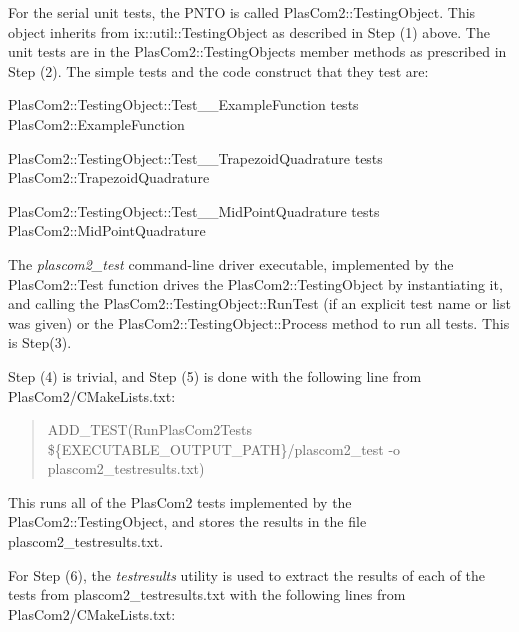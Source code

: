 For the serial unit tests, the P\+N\+TO is called Plas\+Com2\+::\+Testing\+Object. This object inherits from ix\+::util\+::\+Testing\+Object as described in Step (1) above. The unit tests are in the Plas\+Com2\+::\+Testing\+Object\textquotesingle{}s member methods as prescribed in Step (2). The simple tests and the code construct that they test are\+:
\begin{DoxyItemize}
\item Plas\+Com2\+::\+Testing\+Object\+::\+Test\+\_\+\+\_\+\+Example\+Function tests Plas\+Com2\+::\+Example\+Function
\item Plas\+Com2\+::\+Testing\+Object\+::\+Test\+\_\+\+\_\+\+Trapezoid\+Quadrature tests Plas\+Com2\+::\+Trapezoid\+Quadrature
\item Plas\+Com2\+::\+Testing\+Object\+::\+Test\+\_\+\+\_\+\+Mid\+Point\+Quadrature tests Plas\+Com2\+::\+Mid\+Point\+Quadrature
\end{DoxyItemize}

The {\itshape plascom2\+\_\+test} command-\/line driver executable, implemented by the Plas\+Com2\+::\+Test function drives the Plas\+Com2\+::\+Testing\+Object by instantiating it, and calling the Plas\+Com2\+::\+Testing\+Object\+::\+Run\+Test (if an explicit test name or list was given) or the Plas\+Com2\+::\+Testing\+Object\+::\+Process method to run all tests. This is Step(3).

Step (4) is trivial, and Step (5) is done with the following line from {\ttfamily Plas\+Com2/\+C\+Make\+Lists.\+txt}\+:

\begin{quote}
A\+D\+D\+\_\+\+T\+E\+ST(Run\+Plas\+Com2\+Tests \$\{E\+X\+E\+C\+U\+T\+A\+B\+L\+E\+\_\+\+O\+U\+T\+P\+U\+T\+\_\+\+P\+A\+TH\}/plascom2\+\_\+test -\/o plascom2\+\_\+testresults.\+txt) \end{quote}


This runs all of the Plas\+Com2 tests implemented by the Plas\+Com2\+::\+Testing\+Object, and stores the results in the file {\ttfamily plascom2\+\_\+testresults.\+txt}.

For Step (6), the {\itshape testresults} utility is used to extract the results of each of the tests from {\ttfamily plascom2\+\_\+testresults.\+txt} with the following lines from {\ttfamily Plas\+Com2/\+C\+Make\+Lists.\+txt}\+:

